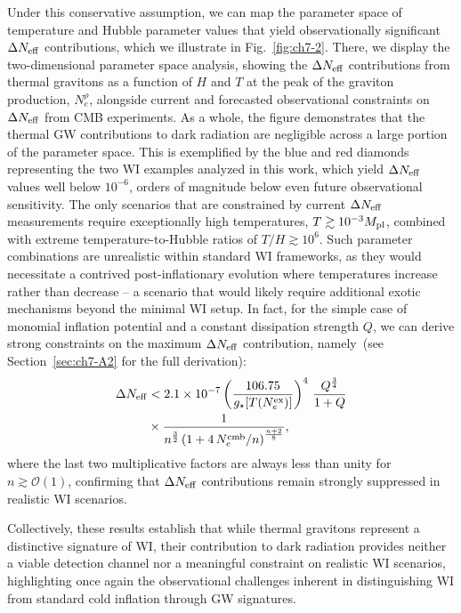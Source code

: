 Under this conservative assumption, we can map the parameter space of temperature and Hubble parameter values that yield observationally significant $\Delta N_{\rm eff}$ contributions, which we illustrate in Fig.~\ref{fig:ch7-2}. There, we display the two-dimensional parameter space analysis, showing the $\Delta N_{\rm eff}$ contributions from thermal gravitons as a function of $H$ and $T$ at the peak of the graviton production, $N_e^\rho$, alongside current and forecasted observational constraints on $\Delta N_{\rm eff}$ from CMB experiments. As a whole, the figure demonstrates that the thermal GW contributions to dark radiation are negligible across a large portion of the parameter space. This is exemplified by the blue and red diamonds representing the two WI examples analyzed in this work, which yield $\Delta N_{\rm eff}$ values well below $10^{-6}$, orders of magnitude below even future observational sensitivity. The only scenarios that are constrained by current $\Delta N_{\rm eff}$ measurements require exceptionally high temperatures, $T\gtrsim10^{-3} M_{\rm pl}$, combined with extreme temperature-to-Hubble ratios of $T/H\gtrsim 10^{6}$. Such parameter combinations are unrealistic within standard WI frameworks, as they would necessitate a contrived post-inflationary evolution where temperatures increase rather than decrease -- a scenario that would likely require additional exotic mechanisms beyond the minimal WI setup. In fact, for the simple case of monomial inflation potential and a constant dissipation strength $Q$, we can derive strong constraints on the maximum $\Delta N_{\rm eff}$ contribution, namely~(see Section~\ref{sec:ch7-A2} for the full derivation):
\begin{align}
\Delta N_{\rm eff}&< 2.1\times 10^{-7} \left( \frac{106.75}{g_\star[T(N_e^{\rm ex})]}\right)^4\,\frac{Q^{\frac{3}{4}}}{1+Q} \nonumber \\
&\times \frac{1}{n^{\frac{3}{2}}\left(1+4\,N_e^{\rm cmb}/n\right)^{\frac{n+2}{8}}},
\end{align}
where the last two multiplicative factors are always less than unity for $n \gtrsim \mathcal{O}(1)$, confirming that $\Delta N_{\rm eff}$ contributions remain strongly suppressed in realistic WI scenarios.

Collectively, these results establish that while thermal gravitons represent a distinctive signature of WI, their contribution to dark radiation provides neither a viable detection channel nor a meaningful constraint on realistic WI scenarios, highlighting once again the observational challenges inherent in distinguishing WI from standard cold inflation through GW signatures.


